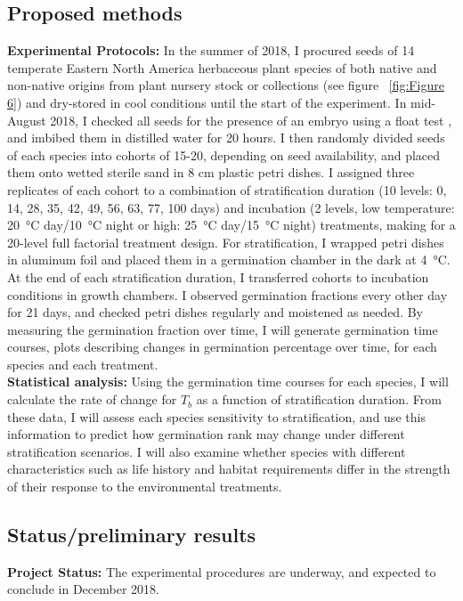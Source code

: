 \documentclass{article}\usepackage[]{graphicx}\usepackage[]{color}
\begin{document}
\subsection*{Proposed methods}
\indent\indent\textbf{Experimental Protocols:} In the summer of 2018, I procured seeds of 14 temperate Eastern North America herbaceous plant species of both native and non-native origins from plant nursery stock or collections (see figure ~\ref{fig:Figure 6}) and dry-stored in cool conditions until the start of the experiment. In mid-August 2018, I checked all seeds for the presence of an embryo using a float test \citep{Baskin2014}, and imbibed them in distilled water for 20 hours. I then randomly divided seeds of each species into cohorts of 15-20, depending on seed availability, and placed them onto wetted sterile sand in 8 cm plastic petri dishes. I assigned three replicates of each cohort to a combination of stratification duration (10 levels: 0, 14, 28, 35, 42, 49, 56, 63, 77, 100 days) and incubation (2 levels, low temperature: \SI{20}{\degreeCelsius} day/\SI{10}{\degreeCelsius} night or high: \SI{25}{\degreeCelsius} day/\SI{15}{\degreeCelsius} night) treatments, making for a 20-level full factorial treatment design. For stratification, I wrapped petri dishes in aluminum foil and placed them in a germination chamber in the dark at \SI{4}{\degreeCelsius}. At the end of each stratification duration, I transferred cohorts to incubation conditions in growth chambers. I observed germination fractions every other day for 21 days, and checked petri dishes regularly and moistened as needed. By measuring the germination fraction over time, I will generate germination time courses, plots describing changes in germination percentage over time, for each species and each treatment.\\
\indent\textbf{Statistical analysis:} Using the germination time courses for each species, I will calculate the rate of change for $T_b$ as a function of stratification duration. From these data, I will assess each species sensitivity to stratification, and use this information to predict how germination rank may change under different stratification scenarios. I will also examine whether species with different characteristics such as life history and habitat requirements differ in the strength of their response to the environmental treatments.\\
\subsection*{Status/preliminary results}
\textbf{Project Status:} The experimental procedures are underway, and expected to conclude in December 2018.
\end{document}
